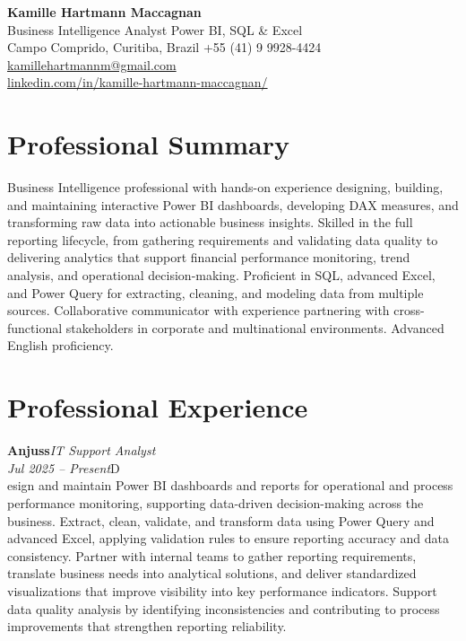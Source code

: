 \documentclass[11pt,a4paper]{article}
\newcommand{\cvrole}[4]{%
  \vspace{4pt}%
  {\bfseries\color{accentcolor}#1}\hfill{\itshape #2}\\[-2pt]%
  {\itshape #3}\hfill #4\\[6pt]%
}
\begin{document}
\begin{center}
  {\fontsize{20}{24}\selectfont\bfseries Kamille Hartmann Maccagnan}\\[8pt]
  {\large Business Intelligence Analyst \textbar{} Power BI, SQL \& Excel}\\[10pt]
  Campo Comprido, Curitiba, Brazil \enspace\textbullet\enspace +55 (41) 9 9928-4424 \enspace\textbullet\enspace
  \href{mailto:kamillehartmannm@gmail.com}{kamillehartmannm@gmail.com}\\[3pt]
  \href{https://linkedin.com/in/kamille-hartmann-maccagnan/}{linkedin.com/in/kamille-hartmann-maccagnan/}
\end{center}

\vspace{6pt}

\section{Professional Summary}

Business Intelligence professional with hands-on experience designing, building, and maintaining interactive Power BI dashboards, developing DAX measures, and transforming raw data into actionable business insights. Skilled in the full reporting lifecycle, from gathering requirements and validating data quality to delivering analytics that support financial performance monitoring, trend analysis, and operational decision-making. Proficient in SQL, advanced Excel, and Power Query for extracting, cleaning, and modeling data from multiple sources. Collaborative communicator with experience partnering with cross-functional stakeholders in corporate and multinational environments. Advanced English proficiency.

\section{Professional Experience}

\cvrole{Anjuss}{IT Support Analyst}{Jul 2025 -- Present}

Design and maintain Power BI dashboards and reports for operational and process performance monitoring, supporting data-driven decision-making across the business. Extract, clean, validate, and transform data using Power Query and advanced Excel, applying validation rules to ensure reporting accuracy and data consistency. Partner with internal teams to gather reporting requirements, translate business needs into analytical solutions, and deliver standardized visualizations that improve visibility into key performance indicators. Support data quality analysis by identifying inconsistencies and contributing to process improvements that strengthen reporting reliability.
\end{document}

